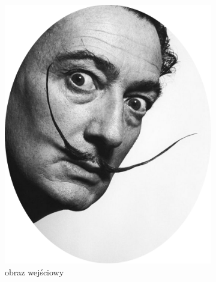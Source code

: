     	\begin{figure}[H] 
        \centering
        \begin{subfigure}{0.24\textwidth}
            \centering
            \includegraphics[width = \textwidth]{img/6-comp/dali_original_c10_inv0.png}
            \caption{obraz wejściowy\\\hphantom{ }\\\hphantom{ }\\\hphantom{ }}
            \label{comp-comp-dali-turing-fawkes-a}
        \end{subfigure}
        \begin{subfigure}{0.24\textwidth}
            \centering

\end{subfigure}
\end{figure}
